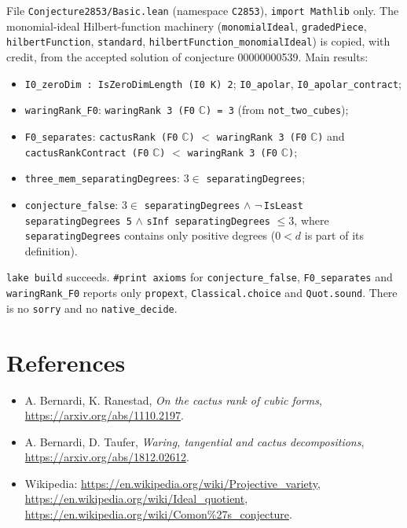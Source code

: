 \documentclass[11pt]{article}
\theoremstyle{definition}
\begin{document}
File \texttt{Conjecture2853/Basic.lean} (namespace \texttt{C2853}), \texttt{import Mathlib} only.
The monomial-ideal Hilbert-function machinery (\texttt{monomialIdeal}, \texttt{gradedPiece},
\texttt{hilbertFunction}, \texttt{standard}, \texttt{hilbertFunction\_monomialIdeal}) is copied,
with credit, from the accepted solution of conjecture 00000000539. Main results:
\begin{itemize}
\item \texttt{I0\_zeroDim : IsZeroDimLength (I0 K) 2}; \texttt{I0\_apolar},
\texttt{I0\_apolar\_contract};
\item \texttt{waringRank\_F0}: \texttt{waringRank 3 (F0} $\mathbb C$\texttt{) = 3} (from
\texttt{not\_two\_cubes});
\item \texttt{F0\_separates}: \texttt{cactusRank (F0} $\mathbb C$\texttt{)} $<$
\texttt{waringRank 3 (F0} $\mathbb C$\texttt{)} and \texttt{cactusRankContract (F0} $\mathbb
C$\texttt{)} $<$ \texttt{waringRank 3 (F0} $\mathbb C$\texttt{)};
\item \texttt{three\_mem\_separatingDegrees}: $3\in$ \texttt{separatingDegrees};
\item \texttt{conjecture\_false}: $3\in$ \texttt{separatingDegrees} $\wedge$
$\neg$\,\texttt{IsLeast separatingDegrees 5} $\wedge$ \texttt{sInf separatingDegrees} $\le 3$,
where \texttt{separatingDegrees} contains only positive degrees ($0<d$ is part of its
definition).
\end{itemize}
\texttt{lake build} succeeds. \texttt{\#print axioms} for \texttt{conjecture\_false},
\texttt{F0\_separates} and \texttt{waringRank\_F0} reports only \texttt{propext},
\texttt{Classical.choice} and \texttt{Quot.sound}. There is no \texttt{sorry} and no
\texttt{native\_decide}.

\section*{References}
\begin{itemize}
\item[{[BR]}] A. Bernardi, K. Ranestad, \emph{On the cactus rank of cubic forms},
\url{https://arxiv.org/abs/1110.2197}.
\item[{[BT]}] A. Bernardi, D. Taufer, \emph{Waring, tangential and cactus decompositions},
\url{https://arxiv.org/abs/1812.02612}.
\item Wikipedia: \url{https://en.wikipedia.org/wiki/Projective_variety},
\url{https://en.wikipedia.org/wiki/Ideal_quotient},
\url{https://en.wikipedia.org/wiki/Comon%27s_conjecture}.
\end{itemize}
\end{document}

